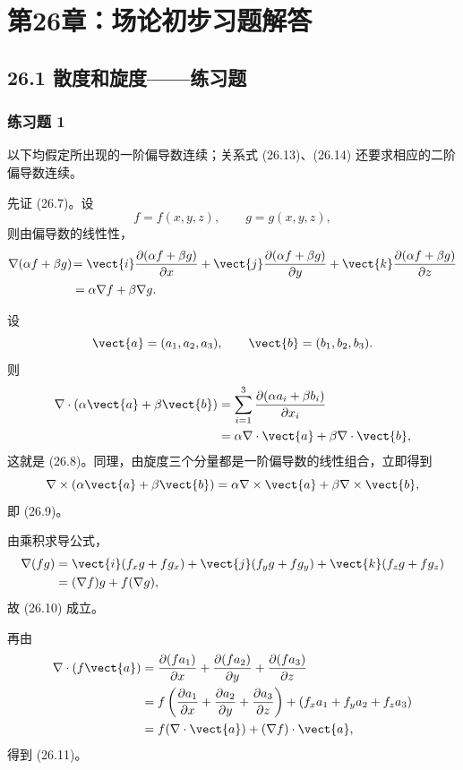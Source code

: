 
\chapter*{第26章：场论初步习题解答}

\section*{26.1 散度和旋度——练习题}

\subsection*{练习题 1}
\begin{xsolution}
以下均假定所出现的一阶偏导数连续；关系式 (26.13)、(26.14) 还要求相应的二阶偏导数连续。

先证 (26.7)。设
\[
  f=f(x,y,z),\qquad g=g(x,y,z),
\]
则由偏导数的线性性，
\begin{align*}
  \nabla(\alpha f+\beta g)
  &\!=\vect{i}\frac{\partial(\alpha f+\beta g)}{\partial x}
   +\vect{j}\frac{\partial(\alpha f+\beta g)}{\partial y}
   +\vect{k}\frac{\partial(\alpha f+\beta g)}{\partial z}\\
  &=\alpha\nabla f+\beta\nabla g.
\end{align*}

设
\[
  \vect{a}=(a_1,a_2,a_3),\qquad \vect{b}=(b_1,b_2,b_3).
\]
则
\begin{align*}
  \nabla\cdot(\alpha\vect{a}+\beta\vect{b})
  &=\sum_{i=1}^3\frac{\partial(\alpha a_i+\beta b_i)}{\partial x_i}\\
  &=\alpha\nabla\cdot\vect{a}+\beta\nabla\cdot\vect{b},
\end{align*}
这就是 (26.8)。同理，由旋度三个分量都是一阶偏导数的线性组合，立即得到
\[
  \nabla\times(\alpha\vect{a}+\beta\vect{b})
  =\alpha\nabla\times\vect{a}+\beta\nabla\times\vect{b},
\]
即 (26.9)。

由乘积求导公式，
\begin{align*}
  \nabla(fg)
  &=\vect{i}(f_xg+fg_x)+\vect{j}(f_yg+fg_y)+\vect{k}(f_zg+fg_z)\\
  &=(\nabla f)g+f(\nabla g),
\end{align*}
故 (26.10) 成立。

再由
\begin{align*}
  \nabla\cdot(f\vect{a})
  &=\frac{\partial(fa_1)}{\partial x}
   +\frac{\partial(fa_2)}{\partial y}
   +\frac{\partial(fa_3)}{\partial z}\\
  &=f\left(\frac{\partial a_1}{\partial x}
   +\frac{\partial a_2}{\partial y}
   +\frac{\partial a_3}{\partial z}\right)
   +\left(f_xa_1+f_ya_2+f_za_3\right)\\
  &=f(\nabla\cdot\vect{a})+(\nabla f)\cdot\vect{a},
\end{align*}
得到 (26.11)。


\end{xsolution}
